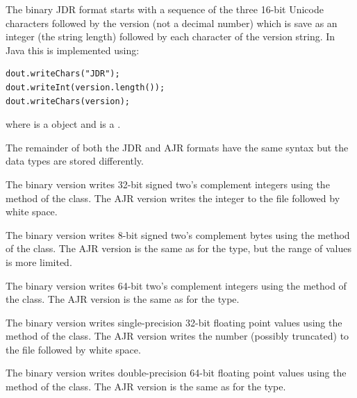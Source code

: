 The binary \gls*{JDR} format starts with a sequence of the three 16-bit Unicode
characters  followed by the version \emph{} (not a
decimal number) which is save as an integer (the string length)
followed by each character of the version string. In Java this is
implemented using:
\begin{verbatim}
dout.writeChars("JDR");
dout.writeInt(version.length());
dout.writeChars(version);
\end{verbatim}
where  is a  object
and  is a .

The remainder of both the \gls*{JDR} and \gls*{AJR} formats have the
same syntax but the data types are stored differently.

\begin{deflist}
\begin{itemdesc}
The binary version writes 32-bit signed two's complement integers using the
 method of the
 class. The \gls{AJR} version writes
the integer to the file followed by white space.
\end{itemdesc}

\begin{itemdesc}
The binary version writes 8-bit signed two's complement bytes using the
 method of the
 class. The \gls{AJR} version is the
same as for the  type, but the range of values is more
limited.
\end{itemdesc}

\begin{itemdesc}
The binary version writes 64-bit two's complement integers using the 
 method of the
 class. The \gls{AJR} version is the
same as for the  type.
\end{itemdesc}

\begin{itemdesc}
The binary version writes single-precision 32-bit floating point
values using the  method of the
 class. The \gls{AJR} version writes
the number (possibly truncated) to the file followed by white space.
\end{itemdesc}

\begin{itemdesc}
The binary version writes double-precision 64-bit floating point
values using the  method of the
 class. The \gls{AJR} version is the
same as for the  type.
\end{itemdesc}


\end{deflist}
